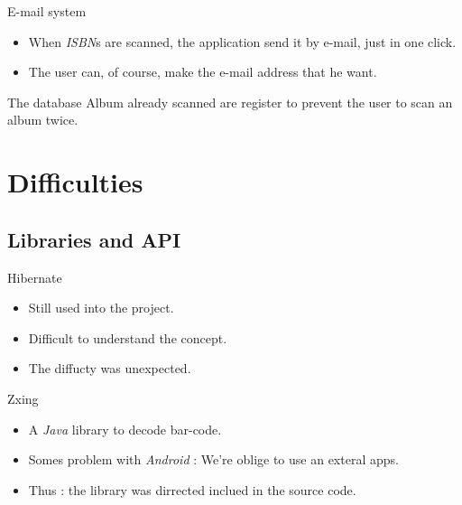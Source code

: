 \documentclass{beamer}
\begin{document}
\begin{frame}
	\begin{block}{E-mail system}
		\begin{itemize}
			\item When \emph{ISBN}s are scanned, the application send it by e-mail, just in one click.
			\pause \item The user can, of course, make the e-mail address that he want.
		\end{itemize}
	\end{block}
	\pause
	\begin{block}{The database}
		\pause
		Album already scanned are register to prevent the user to scan an album twice.
	\end{block}
\end{frame}

\section{Difficulties}
\subsection{Libraries and API}

\begin{frame}
\begin{block}{Hibernate}
\begin{itemize}
\pause \item Still used into the project.
\pause \item Difficult to understand the concept.
\pause \item The diffucty was unexpected.
\end{itemize}
\end{block}


\begin{block}{Zxing}
\begin{itemize}
\pause \item A \emph{Java} library to decode bar-code.
\pause \item Somes problem with \emph{Android} \pause : We're oblige to use an exteral apps.
\pause \item Thus : the library was dirrected inclued in the source code.
\end{itemize}
\end{block}
\end{frame}
\end{document}
